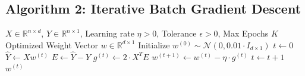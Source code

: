 \documentclass[11pt,a4paper]{article}
\begin{document}
\vspace{1em}

\subsection*{Algorithm 2: Iterative Batch Gradient Descent}

\begin{algorithm}[H]
\caption{Batch Gradient Descent Linear Regression}
\label{alg:gradient_descent}
\begin{algorithmic}[1]
\Require $X \in \mathbb{R}^{n \times d}$, $Y \in \mathbb{R}^{n \times 1}$, Learning rate $\eta > 0$, Tolerance $\epsilon > 0$, Max Epochs $K$
\Ensure Optimized Weight Vector $w \in \mathbb{R}^{d \times 1}$
    \State Initialize $w^{(0)} \sim \mathcal{N}(0, 0.01 \cdot I_{d \times 1})$ 
    \State $t \gets 0$
    \Repeat
        \State $\hat{Y} \gets X w^{(t)}$ 
        \State $E \gets \hat{Y} - Y$ 
        \State $g^{(t)} \gets 2 \cdot X^T E$ 
        \State $w^{(t+1)} \gets w^{(t)} - \eta \cdot g^{(t)}$ 
        \State $t \gets t + 1$
     
    \State \Return $w^{(t)}$
\EndProcedure
\end{algorithmic}
\end{algorithm}
\end{document}
